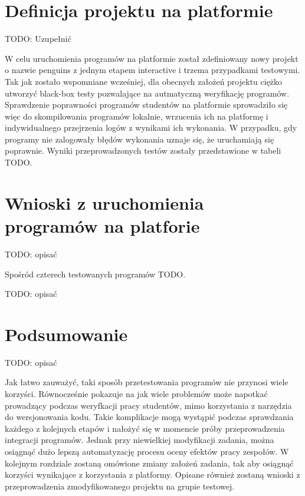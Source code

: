 \section{Definicja projektu na platformie}

TODO: Uzupełnić

W celu uruchomienia programów na platformie został zdefiniowany nowy projekt o nazwie penguins z jednym etapem interactive i trzema przypadkami testowymi.
Tak jak zostało wspomniane wcześniej, dla obecnych założeń projektu ciężko utworzyć black-box testy pozwalające na autmatyczną weryfikację programów.
Sprawdzenie poprawności programów studentów na platformie sprowadziło się więc do skompilowania programów lokalnie, wrzucenia ich na platformę i indywidualnego przejrzenia logów z wynikami ich wykonania.
W przypadku, gdy programy nie zalogowały błędów wykonania uznaje się, że uruchamiają się poprawnie.
Wyniki przeprowadzonych testów zostały przedstawione w tabeli TODO.


\section{Wnioski z uruchomienia programów na platforie}

TODO: opisać

Spośród czterech testowanych programów TODO.


TODO: opisać


\section{Podsumowanie}
\label{verification_summary}


TODO: opisać

Jak łatwo zauważyć, taki sposób przetestowania programów nie przynosi wiele korzyści.
Równocześnie pokazuje na jak wiele problemów może napotkać prowadzący podczas weryfkacji pracy studentów, mimo korzystania z narzędzia do wersjonowania kodu.
Takie komplikacje mogą wystąpić podczas sprawdzania każdego z kolejnych etapów i nałożyć się w momencie próby przeprowadzenia integracji programów.
Jednak przy niewielkiej modyfikacji zadania, można osiągnąć dużo lepszą automatyzację procesu oceny efektów pracy zespołów.
W kolejnym rozdziale zostaną omówione zmiany założeń zadania, tak aby osiągnąć korzyści wynikające z korzystania z platformy.
Opisane również zostaną wnioski z przeprowadzenia zmodyfikowanego projektu na grupie testowej.
